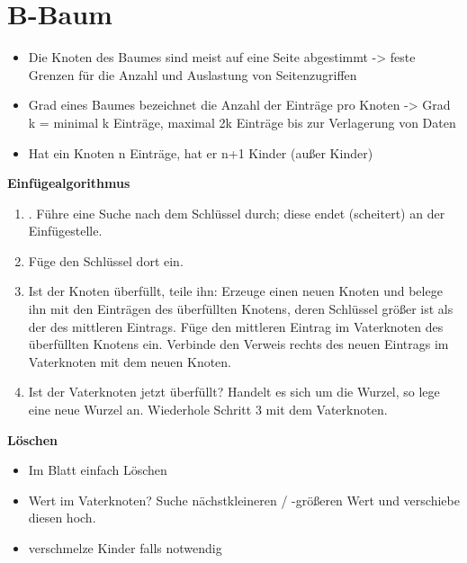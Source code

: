 \section{B-Baum}
\begin{itemize}
\item Die Knoten des Baumes sind meist auf eine Seite abgestimmt -> feste Grenzen für die Anzahl und Auslastung von Seitenzugriffen
\item Grad eines Baumes bezeichnet die Anzahl der Einträge pro Knoten -> Grad k = minimal k Einträge, maximal 2k Einträge bis zur Verlagerung von Daten
\item Hat ein Knoten n Einträge, hat er n+1 Kinder (außer Kinder)
\end{itemize}
\textbf{Einfügealgorithmus}
\begin{enumerate}
\item . Führe eine Suche nach dem Schlüssel durch; diese endet (scheitert) an der Einfügestelle.
\item  Füge den Schlüssel dort ein.
\item  Ist der Knoten überfüllt, teile ihn:
\subitem 	Erzeuge einen neuen Knoten und belege ihn mit den Einträgen des überfüllten Knotens, deren Schlüssel größer ist als der des mittleren Eintrags.
\subitem 	Füge den mittleren Eintrag im Vaterknoten des überfüllten Knotens ein.
\subitem 	Verbinde den Verweis rechts des neuen Eintrags im Vaterknoten mit dem neuen Knoten.
\item Ist der Vaterknoten jetzt überfüllt?
\subitem 	Handelt es sich um die Wurzel, so lege eine neue Wurzel an.
\subitem 	Wiederhole Schritt 3 mit dem Vaterknoten.
\end{enumerate}
\textbf{Löschen}\\
\begin{itemize}
\item Im Blatt einfach Löschen 
\item Wert im Vaterknoten? Suche nächstkleineren / -größeren Wert und verschiebe diesen hoch. 
\item verschmelze Kinder falls notwendig
\end{itemize}
